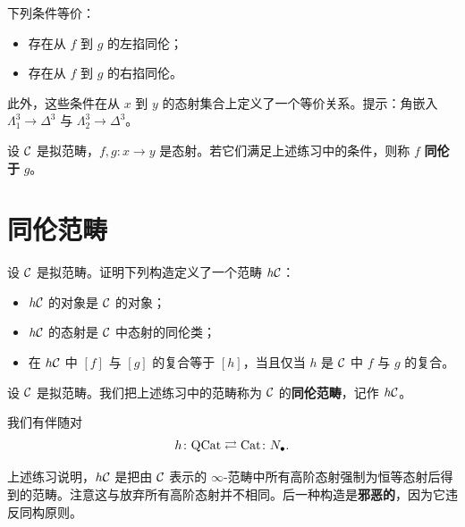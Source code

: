 \begin{exercise}\label{L4-3.2}
下列条件等价：
\begin{itemize}[leftmargin=2.2em,itemsep=0.1em]
\item 存在从 $f$ 到 $g$ 的左掐同伦；
\item 存在从 $f$ 到 $g$ 的右掐同伦。
\end{itemize}
此外，这些条件在从 $x$ 到 $y$ 的态射集合上定义了一个等价关系。提示：角嵌入 $\Lambda^3_1\to\Delta^3$ 与 $\Lambda^3_2\to\Delta^3$。
\end{exercise}

\begin{definition}\label{L4-3.3}
设 $\mathcal{C}$ 是拟范畴，$f,g\colon x\to y$ 是态射。若它们满足上述练习中的条件，则称 $f$ \textbf{同伦于} $g$。
\end{definition}

\section{同伦范畴}

\begin{exercise}\label{L4-4.1}
设 $\mathcal{C}$ 是拟范畴。证明下列构造定义了一个范畴 $h\mathcal{C}$：
\begin{itemize}[leftmargin=2.2em,itemsep=0.1em]
\item $h\mathcal{C}$ 的对象是 $\mathcal{C}$ 的对象；
\item $h\mathcal{C}$ 的态射是 $\mathcal{C}$ 中态射的同伦类；
\item 在 $h\mathcal{C}$ 中 $[f]$ 与 $[g]$ 的复合等于 $[h]$，当且仅当 $h$ 是 $\mathcal{C}$ 中 $f$ 与 $g$ 的复合。
\end{itemize}
\end{exercise}

\begin{definition}\label{L4-4.2}
设 $\mathcal{C}$ 是拟范畴。我们把上述练习中的范畴称为 $\mathcal{C}$ 的\textbf{同伦范畴}，记作 $h\mathcal{C}$。
\end{definition}

\begin{exercise}\label{L4-4.3}
我们有伴随对
\[
h\colon \mathrm{QCat} \rightleftarrows \operatorname{Cat} \colon N_{\bullet}.
\]
\end{exercise}

\begin{remark}\label{L4-4.4}
上述练习说明，$h\mathcal{C}$ 是把由 $\mathcal{C}$ 表示的 $\infty$-范畴中所有高阶态射强制为恒等态射后得到的范畴。注意这与放弃所有高阶态射并不相同。后一种构造是\textbf{邪恶的}，因为它违反同构原则。
\end{remark}

